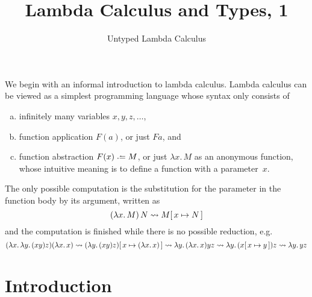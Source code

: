 \title{Lambda Calculus and Types, 1}
\subtitle{Untyped Lambda Calculus}

\begin{frame}
\maketitle
\end{frame}

We begin with an informal introduction to lambda calculus. Lambda calculus can
be viewed as a simplest programming language whose syntax only consists of
\begin{enumerate}[(a)]
  \item infinitely many variables $x, y, z, \ldots$, 
  \item function application $F(a)$, or just $F a$, and
  \item function abstraction $F(x) \defeq M$, or just $\lambda x.\, M$
    as an anonymous function, whose intuitive meaning is to define a function
    with a parameter~$x$.
\end{enumerate}
The only possible computation is the substitution for the parameter in the
function body by its argument, written as 
\[
  (\lambda x.\, M)\, N \leadsto M[\,x\mapsto N\,]
\]
and the computation is finished while there is no possible reduction, e.g.
\[
  (\lambda x.\, \lambda y.\, (x y) z) (\lambda x.\, x)
  \leadsto (\lambda y.\, (x y) z)[\,x\mapsto(\lambda x.\, x)\,]
  \leadsto \lambda y.\, (\lambda x.\, x) y z
  \leadsto \lambda y.\, (x[\,x\mapsto y\,]) z
  \leadsto \lambda y.\, y z
\]

\section{Introduction}

